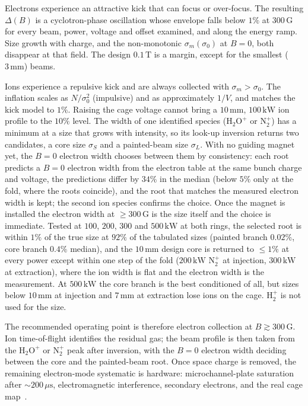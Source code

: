\documentclass[hyperref]{cernrep}
\begin{document}
Electrons experience an attractive kick that can focus or over-focus.
The resulting $\Delta(B)$ is a cyclotron-phase oscillation whose
envelope falls below $1\%$ at $300\,\mathrm{G}$ for every beam, power,
voltage and offset examined, and along the energy ramp. Size growth
with charge, and the non-monotonic $\sigma_m(\sigma_0)$ at $B=0$, both
disappear at that field. The design $0.1\,\mathrm{T}$ is a margin,
except for the smallest ($3\,\mathrm{mm}$) beams.

Ions experience a repulsive kick and are always collected with
$\sigma_m>\sigma_0$. The inflation scales as $N/\sigma_0^2$
(impulsive) and as approximately $1/V$, and matches the kick model to
$1\%$. Raising the cage voltage cannot bring a $10\,\mathrm{mm}$,
$100\,\mathrm{kW}$ ion profile to the $10\%$ level. The width of one
identified species ($\mathrm{H}_2\mathrm{O}^+$ or $\mathrm{N}_2^+$)
has a minimum at a size that grows with intensity, so its look-up
inversion returns two candidates, a core size $\sigma_S$ and a
painted-beam size $\sigma_L$. With no guiding magnet yet, the $B=0$
electron width chooses between them by consistency: each root
predicts a $B=0$ electron width from the electron table at the same
bunch charge and voltage, the predictions differ by $34\%$ in the
median (below $5\%$ only at the fold, where the roots coincide), and
the root that matches the measured electron width is kept; the second
ion species confirms the choice. Once the magnet is installed the
electron width at $\ge 300\,\mathrm{G}$ is the size itself and the
choice is immediate. Tested at $100$, $200$, $300$
and $500\,\mathrm{kW}$ at both rings, the selected root is within
$1\%$ of the true size at $92\%$ of the tabulated sizes (painted branch
$0.02\%$, core branch $0.4\%$ median), and the $10\,\mathrm{mm}$
design core is returned to $\le 1\%$ at every power except within one
step of the fold ($200\,\mathrm{kW}$ $\mathrm{N}_2^+$ at injection,
$300\,\mathrm{kW}$ at extraction), where the ion width is flat and the
electron width is the measurement. At $500\,\mathrm{kW}$ the core
branch is the best conditioned of all, but sizes below
$10\,\mathrm{mm}$ at injection and $7\,\mathrm{mm}$ at extraction
lose ions on the cage. $\mathrm{H}_2^+$ is not used for the size.

The recommended operating point is therefore electron collection at
$B\gtrsim 300\,\mathrm{G}$. Ion time-of-flight identifies the residual
gas; the beam profile is then taken from the
$\mathrm{H}_2\mathrm{O}^+$ or $\mathrm{N}_2^+$ peak after inversion,
with the $B=0$ electron width deciding between the core and the
painted-beam root.
Once space charge is removed, the remaining electron-mode
systematic is hardware: microchannel-plate saturation after
$\sim 200\,\mu\mathrm{s}$, electromagnetic interference, secondary
electrons, and the real cage map~\cite{Rehman2024,Rehman2025,Xiao2026}.
\end{document}
